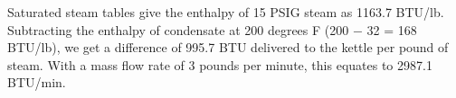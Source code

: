 \vskip 10pt

Saturated steam tables give the enthalpy of 15 PSIG steam as 1163.7 BTU/lb.  Subtracting the enthalpy of condensate at 200 degrees F (200 $-$ 32 = 168 BTU/lb), we get a difference of 995.7 BTU delivered to the kettle per pound of steam.  With a mass flow rate of 3 pounds per minute, this equates to 2987.1 BTU/min.





